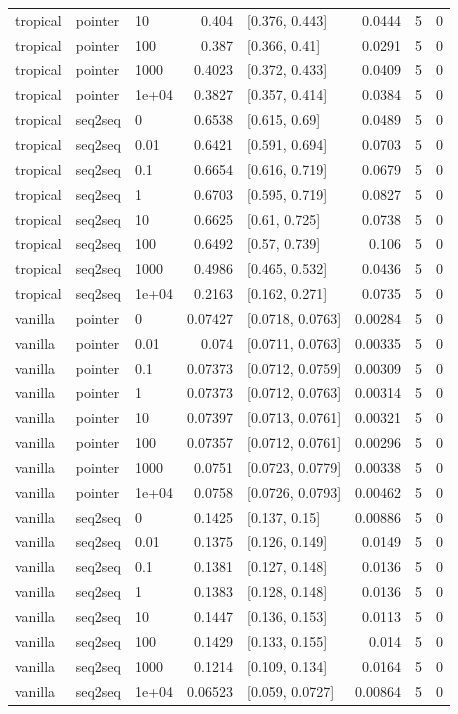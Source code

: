 \documentclass[10pt]{article}
\begin{document}
{\begin{longtable}{lllrlrrr}
tropical & pointer & 10 & 0.404 & [0.376, 0.443] & 0.0444 & 5 & 0\\
tropical & pointer & 100 & 0.387 & [0.366, 0.41] & 0.0291 & 5 & 0\\
tropical & pointer & 1000 & 0.4023 & [0.372, 0.433] & 0.0409 & 5 & 0\\
tropical & pointer & 1e+04 & 0.3827 & [0.357, 0.414] & 0.0384 & 5 & 0\\
tropical & seq2seq & 0 & 0.6538 & [0.615, 0.69] & 0.0489 & 5 & 0\\
tropical & seq2seq & 0.01 & 0.6421 & [0.591, 0.694] & 0.0703 & 5 & 0\\
tropical & seq2seq & 0.1 & 0.6654 & [0.616, 0.719] & 0.0679 & 5 & 0\\
tropical & seq2seq & 1 & 0.6703 & [0.595, 0.719] & 0.0827 & 5 & 0\\
tropical & seq2seq & 10 & 0.6625 & [0.61, 0.725] & 0.0738 & 5 & 0\\
tropical & seq2seq & 100 & 0.6492 & [0.57, 0.739] & 0.106 & 5 & 0\\
tropical & seq2seq & 1000 & 0.4986 & [0.465, 0.532] & 0.0436 & 5 & 0\\
tropical & seq2seq & 1e+04 & 0.2163 & [0.162, 0.271] & 0.0735 & 5 & 0\\
vanilla & pointer & 0 & 0.07427 & [0.0718, 0.0763] & 0.00284 & 5 & 0\\
vanilla & pointer & 0.01 & 0.074 & [0.0711, 0.0763] & 0.00335 & 5 & 0\\
vanilla & pointer & 0.1 & 0.07373 & [0.0712, 0.0759] & 0.00309 & 5 & 0\\
vanilla & pointer & 1 & 0.07373 & [0.0712, 0.0763] & 0.00314 & 5 & 0\\
vanilla & pointer & 10 & 0.07397 & [0.0713, 0.0761] & 0.00321 & 5 & 0\\
vanilla & pointer & 100 & 0.07357 & [0.0712, 0.0761] & 0.00296 & 5 & 0\\
vanilla & pointer & 1000 & 0.0751 & [0.0723, 0.0779] & 0.00338 & 5 & 0\\
vanilla & pointer & 1e+04 & 0.0758 & [0.0726, 0.0793] & 0.00462 & 5 & 0\\
vanilla & seq2seq & 0 & 0.1425 & [0.137, 0.15] & 0.00886 & 5 & 0\\
vanilla & seq2seq & 0.01 & 0.1375 & [0.126, 0.149] & 0.0149 & 5 & 0\\
vanilla & seq2seq & 0.1 & 0.1381 & [0.127, 0.148] & 0.0136 & 5 & 0\\
vanilla & seq2seq & 1 & 0.1383 & [0.128, 0.148] & 0.0136 & 5 & 0\\
vanilla & seq2seq & 10 & 0.1447 & [0.136, 0.153] & 0.0113 & 5 & 0\\
vanilla & seq2seq & 100 & 0.1429 & [0.133, 0.155] & 0.014 & 5 & 0\\
vanilla & seq2seq & 1000 & 0.1214 & [0.109, 0.134] & 0.0164 & 5 & 0\\
vanilla & seq2seq & 1e+04 & 0.06523 & [0.059, 0.0727] & 0.00864 & 5 & 0\\
\bottomrule
\end{longtable}
}
\end{document}

